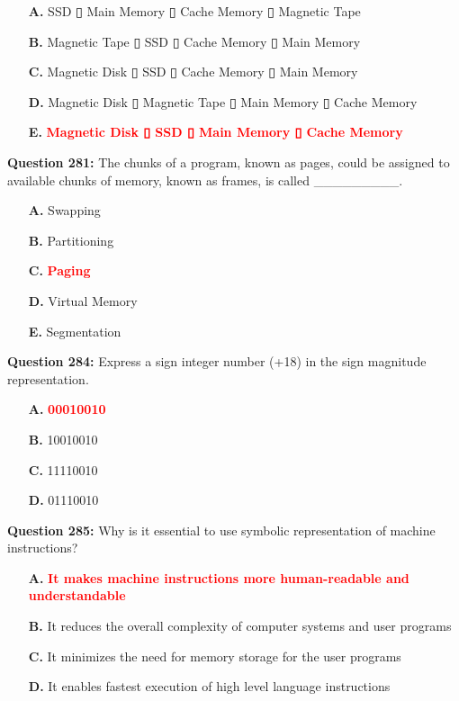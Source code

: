 \documentclass[12pt,a4paper]{article}
\begin{document}
\begin{itemize}
    \item[\textbf{A.}] SSD ▯ Main Memory ▯ Cache Memory ▯ Magnetic Tape
    \item[\textbf{B.}] Magnetic Tape ▯ SSD ▯ Cache Memory ▯ Main Memory
    \item[\textbf{C.}] Magnetic Disk ▯ SSD ▯ Cache Memory ▯ Main Memory
    \item[\textbf{D.}] Magnetic Disk ▯ Magnetic Tape ▯ Main Memory ▯ Cache Memory
    \item[\textbf{E.}] \textcolor{red}{\textbf{Magnetic Disk ▯ SSD ▯ Main Memory ▯ Cache Memory}}
\end{itemize}

\vspace{0.5cm}

\textbf{Question 281:} The chunks of a program, known as pages, could be assigned to available chunks of memory, known as frames, is called _________.

\begin{itemize}
    \item[\textbf{A.}] Swapping
    \item[\textbf{B.}] Partitioning
    \item[\textbf{C.}] \textcolor{red}{\textbf{Paging}}
    \item[\textbf{D.}] Virtual Memory
    \item[\textbf{E.}] Segmentation
\end{itemize}

\vspace{0.5cm}

\textbf{Question 284:} Express a sign integer number (+18) in the sign magnitude representation.

\begin{itemize}
    \item[\textbf{A.}] \textcolor{red}{\textbf{00010010}}
    \item[\textbf{B.}] 10010010
    \item[\textbf{C.}] 11110010
    \item[\textbf{D.}] 01110010
\end{itemize}

\vspace{0.5cm}

\textbf{Question 285:} Why is it essential to use symbolic representation of machine instructions?

\begin{itemize}
    \item[\textbf{A.}] \textcolor{red}{\textbf{It makes machine instructions more human-readable and understandable}}
    \item[\textbf{B.}] It reduces the overall complexity of computer systems and user programs
    \item[\textbf{C.}] It minimizes the need for memory storage for the user programs
    \item[\textbf{D.}] It enables fastest execution of high level language instructions
\end{itemize}
\end{document}
